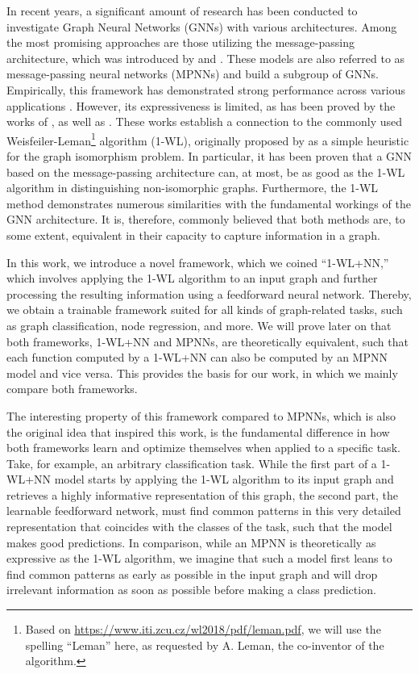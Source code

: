 In recent years, a significant amount of research has been conducted to investigate Graph Neural Networks (GNNs) with various architectures. Among the most promising approaches are those utilizing the message-passing architecture, which was introduced by \cite{Gil+2017} and \cite{Sca+2009}. These models are also referred to as message-passing neural networks (MPNNs) and build a subgroup of GNNs. Empirically, this framework has demonstrated strong performance across various applications \cite{Kip+2017, Ham+2017, Xu2018}. However, its expressiveness is limited, as has been proved by the works of \cite{Morris2018}, as well as \cite{Xu2018}. These works establish a connection to the commonly used Weisfeiler-Leman\footnote{Based on \href{https://www.iti.zcu.cz/wl2018/pdf/leman.pdf}{https://www.iti.zcu.cz/wl2018/pdf/leman.pdf}, we will use the spelling ``Leman'' here, as requested by A. Leman, the co-inventor of the algorithm.} algorithm (1-WL), originally proposed by \cite{Wei+1968} as a simple heuristic for the graph isomorphism problem. In particular, it has been proven that a GNN based on the message-passing architecture can, at most, be as good as the 1-WL algorithm in distinguishing non-isomorphic graphs. Furthermore, the 1-WL method demonstrates numerous similarities with the fundamental workings of the GNN architecture. It is, therefore, commonly believed that both methods are, to some extent, equivalent in their capacity to capture information in a graph.

In this work, we introduce a novel framework, which we coined ``1-WL+NN,'' which involves applying the 1-WL algorithm to an input graph and further processing the resulting information using a feedforward neural network. Thereby, we obtain a trainable framework suited for all kinds of graph-related tasks, such as graph classification, node regression, and more. We will prove later on that both frameworks, 1-WL+NN and MPNNs, are theoretically equivalent, such that each function computed by a 1-WL+NN can also be computed by an MPNN model and vice versa. This provides the basis for our work, in which we mainly compare both frameworks.

The interesting property of this framework compared to MPNNs, which is also the original idea that inspired this work, is the fundamental difference in how both frameworks learn and optimize themselves when applied to a specific task. Take, for example, an arbitrary classification task. While the first part of a 1-WL+NN model starts by applying the 1-WL algorithm to its input graph and retrieves a highly informative representation of this graph, the second part, the learnable feedforward network, must find common patterns in this very detailed representation that coincides with the classes of the task, such that the model makes good predictions. In comparison, while an MPNN is theoretically as expressive as the 1-WL algorithm, we imagine that such a model first leans to find common patterns as early as possible in the input graph and will drop irrelevant information as soon as possible before making a class prediction. 


